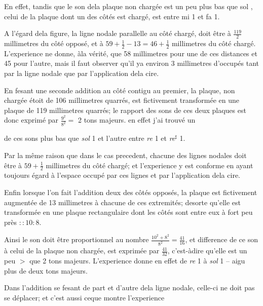 \documentclass[11pt,a4paper]{article}
\begin{document}
 En effet, tandis que le son dela plaque non
chargée est un peu plus bas que sol , celui de
la plaque dont un des côtés est chargé, est entre
mi 1 et fa 1.

A l'égard dela figure,   la ligne nodale
parallelle au côté chargé, doit être à $\frac{119}{2}$  millimetres
du côté opposé, et à $59+\frac{1}{2}-13 = 46+\frac{1}{2}$ millimetres
du côté chargé. L'experience ne donne, àla vérité,
que 58 millimetres pour une de ces distances et
45 pour l'autre, mais il faut observer qu'il ya
environ 3 millimetres d'occupés tant par la ligne
nodale que par l'application dela cire.

En fesant une seconde addition au côté contigu au
premier, la plaque,   non chargée étoit de
106 millimetres quarrés, est fictivement transformée
en une plaque de 119 millimetres quarrés; le
rapport des sons de ces deux plaques est donc exprimé
par $\frac{9^2}{8^2} =$ 2 tons majeurs. en effet j'ai trouvé un


de ces sons plus bas que \emph{sol} 1 et l'autre entre \emph{re} 1 et
\emph{re}$^{\sharp}$ 1.

Par la même raison que dans le cas precedent,
chacune des lignes nodales doit être à $59+\frac{1}{2}$ millimetres
du côté chargé; et l'experience y est conforme en
ayant toujours égard à l'espace occupé par ces
lignes et par l'application dela cire.

Enfin lorsque l'on fait l'addition  deux 
des côtés opposés, la plaque est fictivement augmentée
de 13 millimetres à chacune de ces extremités; desorte
qu'elle est transformée en une plaque rectangulaire
dont les côtés sont entre eux à fort peu près
$:: 10 : 8$.

Ainsi le son doit être proportionnel au nombre
$\frac{10^2+8^2}{8^2} = \frac{41}{16}$, et    difference de
ce son à celui de la plaque non chargée, est
exprimée par $\frac{41}{32}$, c'est-àdire qu'elle est un
peu $>$ que 2 tons majeurs. L'experience donne
en effet de \emph{re} 1 à \emph{sol} 1 – aigu plus de
deux tons majeurs.

Dans   l'addition se fesant de part
et d'autre dela ligne nodale, celle-ci ne doit
pas se déplacer; et c'est aussi ceque montre l'experience
\end{document}
